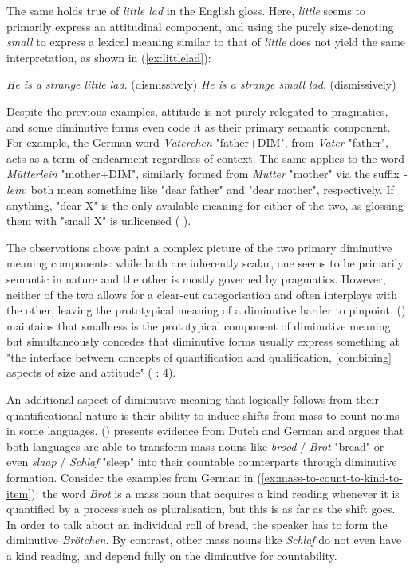The same holds true of \textit{little lad} in the English gloss. Here, \textit{little} seems to primarily express an attitudinal component, and using the purely size-denoting \textit{small} to express a lexical meaning similar to that of \textit{little} does not yield the same interpretation, as shown in (\ref{ex:littlelad}):

\begin{exe}
\ex \label{ex:littlelad}
\begin{xlist}
\ex \textit{He is a strange little lad}. (dismissively)
\ex *\textit{He is a strange small lad}. (dismissively)
\end{xlist}
\end{exe}

Despite the previous examples, attitude is not purely relegated to pragmatics, and some diminutive forms even code it as their primary semantic component. For example, the German word \textit{Väterchen} "father+DIM", from \textit{Vater} "father", acts as a term of endearment regardless of context. The same applies to the word \textit{Mütterlein} "mother+DIM", similarly formed from \textit{Mutter} "mother" via the suffix \textit{-lein}: both mean something like "dear father" and "dear mother", respectively. If anything, "dear X" is the only available meaning for either of the two, as glossing them with "small X" is unlicensed  (\citeauthor{Schneider+2003} \citeyear{Schneider+2003}).

The observations above paint a complex picture of the two primary diminutive meaning components: while both are inherently scalar, one seems to be primarily semantic in nature and the other is mostly governed by pragmatics. However, neither of the two allows for a clear-cut categorisation and often interplays with the other, leaving the prototypical meaning of a diminutive harder to pinpoint. \citeauthor{Schneider+2003} (\citeyear{Schneider+2003}) maintains that smallness is the prototypical component of diminutive meaning but simultaneously concedes that diminutive forms usually express something at "the interface between concepts of quantification and qualification, [combining] aspects of size and attitude" (\citeauthor{Schneider+2003} \citeyear{Schneider+2003}: 4).

An additional aspect of diminutive meaning that logically follows from their quantificational nature is their ability to induce shifts from mass to count nouns in some languages. \citeauthor{Wiltschko+2006} (\citeyear{Wiltschko+2006}) presents evidence from Dutch and German and argues that both languages are able to transform mass nouns like \textit{brood} / \textit{Brot} "bread" or even \textit{slaap} / \textit{Schlaf} "sleep" into their countable counterparts through diminutive formation. Consider the examples from German in (\ref{ex:mass-to-count-to-kind-to-item}): the word \textit{Brot} is a mass noun that acquires a kind reading whenever it is quantified by a process such as pluralisation, but this is as far as the shift goes. In order to talk about an individual roll of bread, the speaker has to form the diminutive \textit{Brötchen}. By contrast, other mass nouns like \textit{Schlaf} do not even have a kind reading, and depend fully on the diminutive for countability.

